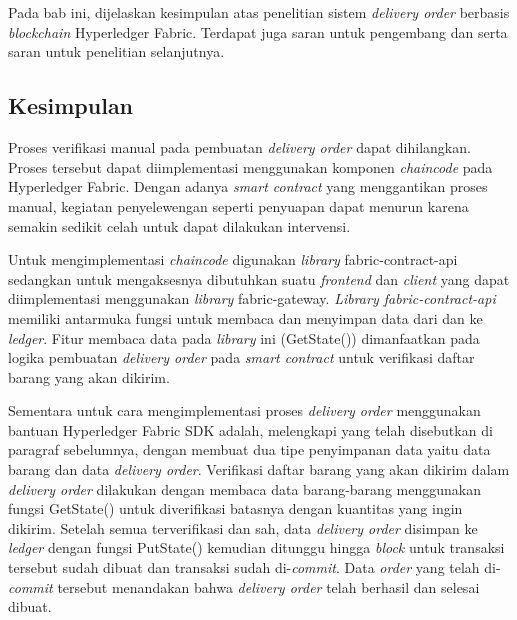 \chapter{\kesimpulan}
\label{bab:6}
Pada bab ini, dijelaskan kesimpulan atas penelitian sistem \textit{delivery order} berbasis \textit{blockchain} Hyperledger Fabric. Terdapat juga saran untuk pengembang dan serta saran untuk penelitian selanjutnya.


\section{Kesimpulan}
\label{sec:kesimpulan}

Proses verifikasi manual pada pembuatan \textit{delivery order} dapat dihilangkan. Proses tersebut dapat diimplementasi menggunakan komponen \textit{chaincode} pada Hyperledger Fabric. Dengan adanya \textit{smart contract} yang menggantikan proses manual, kegiatan penyelewengan seperti penyuapan dapat menurun karena semakin sedikit celah untuk dapat dilakukan intervensi. 

Untuk mengimplementasi \textit{chaincode} digunakan \textit{library} fabric-contract-api sedangkan untuk mengaksesnya dibutuhkan suatu \textit{frontend} dan \textit{client} yang dapat diimplementasi menggunakan \textit{library} fabric-gateway. \textit{Library fabric-contract-api} memiliki antarmuka fungsi untuk membaca dan menyimpan data dari dan ke \textit{ledger}. Fitur membaca data pada \textit{library} ini (GetState()) dimanfaatkan pada logika pembuatan \textit{delivery order} pada \textit{smart contract} untuk verifikasi daftar barang yang akan dikirim.

Sementara untuk cara mengimplementasi proses \textit{delivery order} menggunakan bantuan Hyperledger Fabric SDK adalah, melengkapi yang telah disebutkan di paragraf sebelumnya, dengan membuat dua tipe penyimpanan data yaitu data barang dan data \textit{delivery order}. Verifikasi daftar barang yang akan dikirim dalam \textit{delivery order} dilakukan dengan membaca data barang-barang menggunakan fungsi GetState() untuk diverifikasi batasnya dengan kuantitas yang ingin dikirim. Setelah semua terverifikasi dan sah, data \textit{delivery order} disimpan ke \textit{ledger} dengan fungsi PutState() kemudian ditunggu hingga \textit{block} untuk transaksi tersebut sudah dibuat dan transaksi sudah di-\textit{commit}. Data \textit{order} yang telah di-\textit{commit} tersebut menandakan bahwa \textit{delivery order} telah berhasil dan selesai dibuat.

